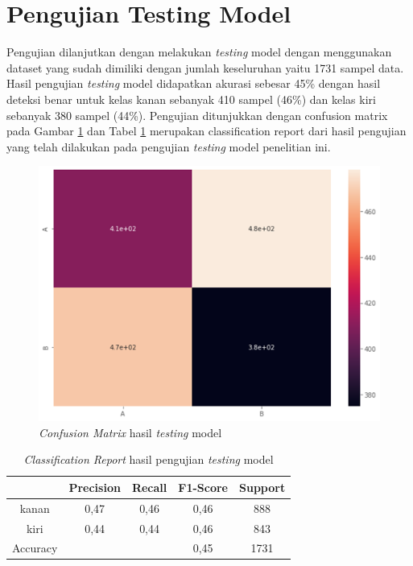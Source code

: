 \section{Pengujian Testing Model}
\label{sec:PengujianTestingModel}

Pengujian dilanjutkan dengan melakukan \emph{testing} model dengan menggunakan dataset yang sudah dimiliki dengan jumlah keseluruhan yaitu 1731 sampel data. Hasil pengujian \emph{testing} model didapatkan akurasi sebesar 45\% dengan hasil deteksi benar untuk kelas kanan sebanyak 410 sampel (46\%) dan kelas kiri sebanyak 380 sampel (44\%). Pengujian ditunjukkan dengan confusion matrix pada Gambar \ref{fig:HasilTesting} dan Tabel \ref{tb:ClassificationReport} merupakan classification report dari hasil pengujian yang telah dilakukan pada pengujian \emph{testing} model penelitian ini.

\begin{figure}[H]
  \centering
  \includegraphics[scale=0.8]{gambar/hasil confusion matrix.png}
  \caption{\emph{Confusion Matrix} hasil \emph{testing} model}
  \label{fig:HasilTesting}
\end{figure}

\begin{longtable}{|c|c|c|c|c|}
  \caption{\emph{Classification Report} hasil pengujian \emph{testing} model}
  \label{tb:ClassificationReport}                                   \\
  \hline
  \rowcolor[HTML]{C0C0C0}
   & \textbf{Precision} & \textbf{Recall} & \textbf{F1-Score} & \textbf{Support} \\
  \hline
  kanan     & 0,47    & 0,46    & 0,46    & 888         \\
  \hline
  kiri      & 0,44    & 0,44    & 0,46    & 843           \\
  \hline
  Accuracy  &         &         & 0,45    & 1731            \\
  \hline
\end{longtable}


